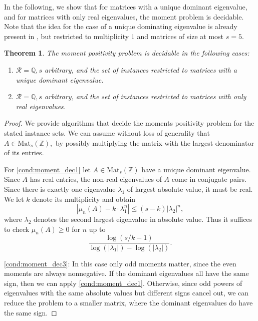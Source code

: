 \documentclass[11pt]{article}
\newtheorem{theorem}{Theorem}
\theoremstyle{definition}
\newcommand{\Mat}{\mathrm{Mat}}
\begin{document}
In the following, we show that for matrices with a unique  dominant eigenvalue, and  for matrices with only real eigenvalues, the moment problem is decidable. Note that the idea for the case of a unique dominating eigenvalue is already present in \cite{OW}, but restricted to  multiplicity $1$ and matrices of size at most $s=5$.
\begin{theorem} 
\label{thm:moment_decidable}
The moment positivity problem is decidable in the following cases:

\begin{enumerate}[label=$(\roman*)$]
	\item\label{cond:moment_dec1} $\mathcal R=\mathbb Q, s$ arbitrary, and the set of instances restricted to matrices with a unique dominant eigenvalue. 
	\item\label{cond:moment_dec3} $\mathcal R=\mathbb Q, s$ arbitrary, and the set of instances restricted to matrices with only real eigenvalues.
\end{enumerate}
\end{theorem}

\begin{proof} We provide algorithms that decide the moments positivity problem for the stated instance sets. We can assume without loss of generality that $A \in \Mat_s(\mathbb{Z}),$ by possibly multiplying the matrix with the largest denominator of its entries.

For \ref{cond:moment_dec1} let $A \in \Mat_s(\mathbb Z)$ have a unique dominant eigenvalue. Since $A$ has real entries, the non-real eigenvalues of $A$ come in conjugate pairs. Since there is exactly one eigenvalue $\lambda_1$ of largest absolute value, it must be real. We  let $k$ denote its multiplicity and obtain $$|\mu_n(A) -  k\cdot \lambda_1^n| \leqslant (s-k) |\lambda_2|^n,$$
where $\lambda_2$ denotes the second largest eigenvalue in absolute value. 
Thus it suffices to check $\mu_n(A) \geqslant 0$ for $n$ up to 
$$\frac{\log(s/k-1)}{ \log(|\lambda_1|)-\log(|\lambda_2|)}.$$

\ref{cond:moment_dec3}: In this case only odd moments matter, since the even moments are always nonnegative. If the dominant eigenvalues all have the same sign, then we can apply \ref{cond:moment_dec1}. Otherwise,  since odd powers of eigenvalues with the same absolute values but different signs cancel out, we can reduce the problem to a smaller matrix, where the dominant eigenvalues do have the same sign.
\end{proof}
\end{document}
